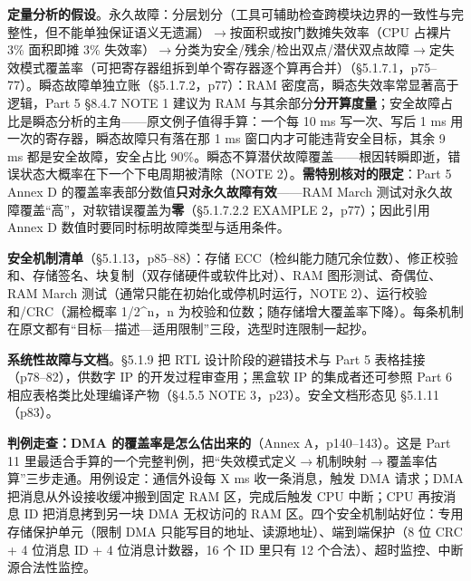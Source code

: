 \textbf{定量分析的假设}。永久故障：分层划分（工具可辅助检查跨模块边界的一致性与完整性，但不能单独保证语义无遗漏）\(\rightarrow\)按面积或按门数摊失效率（CPU 占裸片 3\% 面积即摊 3\% 失效率）\(\rightarrow\)分类为安全/残余/检出双点/潜伏双点故障\(\rightarrow\)定失效模式覆盖率（可把寄存器组拆到单个寄存器逐个算再合并）（§5.1.7.1，p75–77）。瞬态故障单独立账（§5.1.7.2，p77）：RAM 密度高，瞬态失效率常显著高于逻辑，Part 5 §8.4.7 NOTE 1 建议为 RAM 与其余部分\textbf{分开算度量}；安全故障占比是瞬态分析的主角——原文例子值得手算：一个每 10 ms 写一次、写后 1 ms 用一次的寄存器，瞬态故障只有落在那 1 ms 窗口内才可能违背安全目标，其余 9 ms 都是安全故障，安全占比 90\%。瞬态不算潜伏故障覆盖——根因转瞬即逝，错误状态大概率在下一个下电周期被清除（NOTE 2）。\textbf{需特别核对的限定}：Part 5 Annex D 的覆盖率表部分数值\textbf{只对永久故障有效}——RAM March 测试对永久故障覆盖“高”，对软错误覆盖为\textbf{零}（§5.1.7.2.2 EXAMPLE 2，p77）；因此引用 Annex D 数值时要同时标明故障类型与适用条件。

\textbf{安全机制清单}（§5.1.13，p85–88）：存储 ECC（检纠能力随冗余位数）、修正校验和、存储签名、块复制（双存储硬件或软件比对）、RAM 图形测试、奇偶位、RAM March 测试（通常只能在初始化或停机时运行，NOTE 2）、运行校验和/CRC（漏检概率 1/2\^{}n，n 为校验和位数；随存储增大覆盖率下降）。每条机制在原文都有“目标—描述—适用限制”三段，选型时连限制一起抄。

\textbf{系统性故障与文档}。§5.1.9 把 RTL 设计阶段的避错技术与 Part 5 表格挂接（p78–82），供数字 IP 的开发过程审查用；黑盒软 IP 的集成者还可参照 Part 6 相应表格类比处理编译产物（§4.5.5 NOTE 3，p23）。安全文档形态见 §5.1.11（p83）。

\textbf{判例走查：DMA 的覆盖率是怎么估出来的}（Annex A，p140–143）。这是 Part 11 里最适合手算的一个完整判例，把“失效模式定义\(\rightarrow\)机制映射\(\rightarrow\)覆盖率估算”三步走通。用例设定：通信外设每 X ms 收一条消息，触发 DMA 请求；DMA 把消息从外设接收缓冲搬到固定 RAM 区，完成后触发 CPU 中断；CPU 再按消息 ID 把消息拷到另一块 DMA 无权访问的 RAM 区。四个安全机制站好位：专用存储保护单元（限制 DMA 只能写目的地址、读源地址）、端到端保护（8 位 CRC + 4 位消息 ID + 4 位消息计数器，16 个 ID 里只有 12 个合法）、超时监控、中断源合法性监控。

